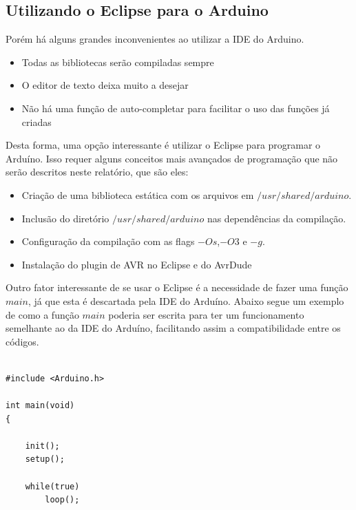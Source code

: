 \begin{multicols}{2}    %

\subsection{Utilizando o Eclipse para o Arduino}\label{eclipse}

Porém há alguns grandes inconvenientes ao utilizar a IDE do Arduino.

\begin{itemize}
	\item Todas as bibliotecas serão compiladas sempre
	\item O editor de texto deixa muito a desejar
	\item Não há uma função de auto-completar para facilitar o uso das funções já criadas
\end{itemize}

Desta forma, uma opção interessante é utilizar o Eclipse para programar o Arduíno. Isso requer alguns conceitos mais avançados de programação que não serão descritos neste relatório, que são eles:

\begin{itemize}
	\item Criação de uma biblioteca estática com os arquivos em $/usr/shared/arduino$.
	\item Inclusão do diretório $/usr/shared/arduino$ nas dependências da compilação.
	\item Configuração da compilação com as flags $-Os$,$-O3$ e $-g$.
	\item Instalação do plugin de AVR no Eclipse e do AvrDude
\end{itemize}

Outro fator interessante de se usar o Eclipse é a necessidade de fazer uma função $main$, já que esta é descartada pela IDE do Arduíno. Abaixo segue um exemplo de como a função $main$ poderia ser escrita para ter um funcionamento semelhante ao da IDE do Arduíno, facilitando assim a compatibilidade entre os códigos.

\begin{lstlisting}[basicstyle=\ttfamily,numbers=none,caption={[Exemplo da função main()]Código de exemplo da função main()}]

#include <Arduino.h>

int main(void)
{

	init();
	setup();

	while(true) 
		loop();


\end{lstlisting}
\end{multicols}
